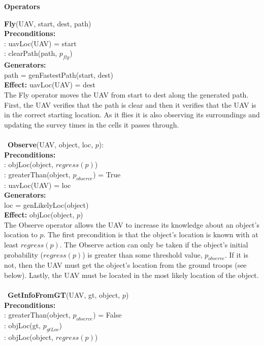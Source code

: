 \documentclass[12pt]{article}
\begin{document}
\begin{center}
\textbf{Operators}
\end{center}
\textbf{Fly}(UAV, start, dest, path) \\
\textbf{Preconditions:} \\
: uavLoc(UAV) = start \\
: clearPath(path, $p_{fly}$) \\
\textbf{Generators:} \\
\indent path = genFastestPath(start, dest) \\
\textbf{Effect:} uavLoc(UAV) = dest \\
The Fly operator moves the UAV from start to dest along the generated path. First, the UAV verifies that the path is clear and then it verifies that the UAV is in the correct starting location. As it flies it is also observing its surroundings and updating the survey times in the cells it passes through.
\\\
\\\
\textbf{Observe}(UAV, object, loc, $p$): \\
\textbf{Preconditions:} \\
\indent 0: objLoc(object, $regress(p)$) \\
\indent 1: greaterThan(object, $p_{observe}$) = True \\
\indent 2: uavLoc(UAV) = loc \\
\textbf{Generators:} \\
\indent loc = genLikelyLoc(object) \\
\textbf{Effect:} objLoc(object, $p$) \\
The Observe operator allows the UAV to increase its knowledge about an object's location to $p$. The first precondition is that the object's location is known with at least $regress(p)$. The Observe action can only be taken if the object's initial probability ($regress(p)$) is greater than some threshold value, $p_{observe}$. If it is not, then the UAV must get the object's location from the ground troops (see below). Lastly, the UAV must be located in the most likely location of the object.
\\\
\\\
\textbf{GetInfoFromGT}(UAV, gt, object, $p$) \\
\textbf{Preconditions:} \\
:  greaterThan(object, $p_{observe}$) = False\\
: objLoc(gt, $p_{gtLoc}$) \\
\indent 2: objLoc(object, $regress(p)$)\\
\end{document}
